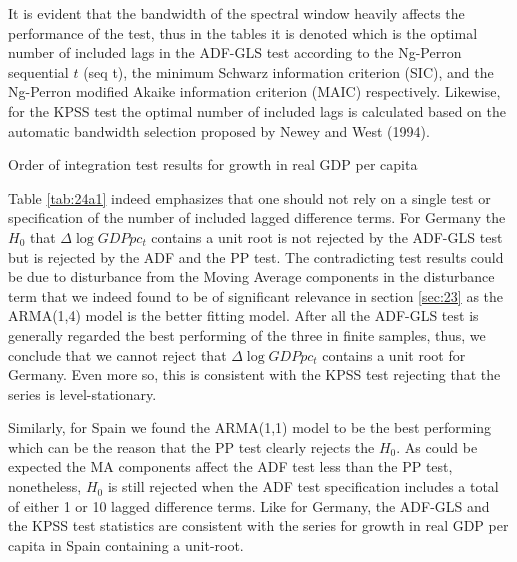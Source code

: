 It is evident that the bandwidth of the spectral window heavily affects the performance of the test, thus in the tables it is denoted which is the optimal number of included lags in the ADF-GLS test according to the Ng-Perron sequential $t$ (seq t), the minimum Schwarz information criterion (SIC), and the Ng-Perron modified Akaike information criterion (MAIC) respectively. Likewise, for the KPSS test the optimal number of included lags is calculated based on the automatic bandwidth selection proposed by Newey and West (1994).
\begin{table}[H]
  \centering
  \caption{Order of integration test results for growth in real GDP per capita}
    \footnotesize
    
    \label{tab:24a1}
\end{table}\noindent
Table \ref{tab:24a1} indeed emphasizes that one should not rely on a single test or specification of the number of included lagged difference terms. For Germany the $H_0$ that $\Delta\log GDPpc_t$ contains a unit root is not rejected by the ADF-GLS test but is rejected by the ADF and the PP test. The contradicting test results could be due to disturbance from the Moving Average components in the disturbance term that we indeed found to be of significant relevance in section \ref{sec:23} as the ARMA(1,4) model is the better fitting model. After all the ADF-GLS test is generally regarded the best performing of the three in finite samples, thus, we conclude that we cannot reject that $\Delta\log GDPpc_t$ contains a unit root for Germany. Even more so, this is consistent with the KPSS test rejecting that the series is level-stationary.

Similarly, for Spain we found the ARMA(1,1) model to be the best performing which can be the reason that the PP test clearly rejects the $H_0$. As could be expected the MA components affect the ADF test less than the PP test, nonetheless, $H_0$ is still rejected when the ADF test specification includes a total of either 1 or 10 lagged difference terms. Like for Germany, the ADF-GLS and the KPSS test statistics are consistent with the series for growth in real GDP per capita in Spain containing a unit-root.


